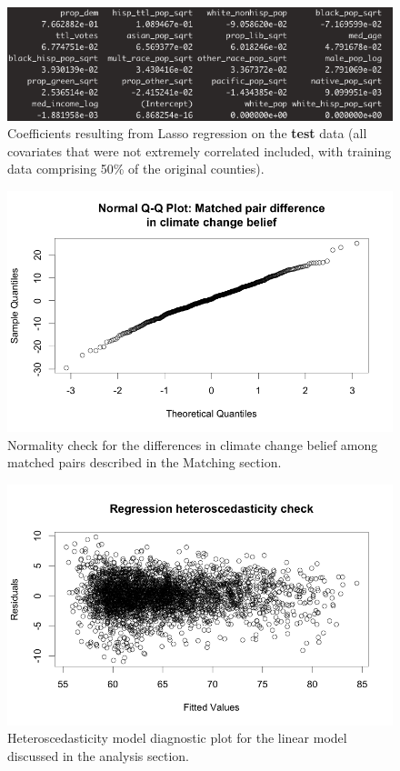 \documentclass{article}
\begin{document}
\begin{figure}[H]
\centering
\includegraphics[scale=0.5]{images/lasso_test.png}
\caption{Coefficients resulting from Lasso regression on the {\bf{test}} data (all covariates that were not extremely correlated included, with training data comprising 50\% of the original counties).}
\end{figure}

\begin{figure}[H]
\centering
\includegraphics[scale=0.5]{images/matched_pair_qq.png}
\caption{Normality check for the differences in climate change belief among matched pairs described in the Matching section.}
\end{figure}

\begin{figure}[H]
\centering
\includegraphics[scale=0.5]{images/regression_variance_check.png}
\caption{Heteroscedasticity model diagnostic plot for the linear model discussed in the analysis section.}
\end{figure}
\end{document}
